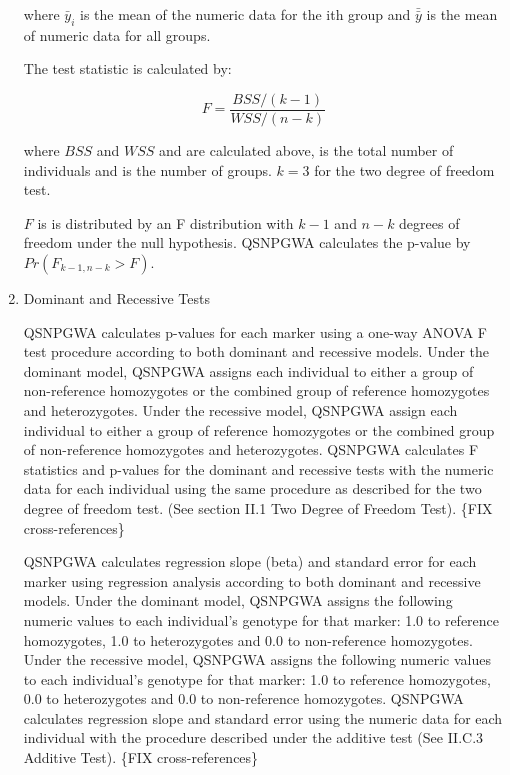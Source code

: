 \begin{enumerate}
  where $\bar{y}_i$ is the mean of the numeric data for the ith group and
  $\bar{\bar{y}}$ is the mean of numeric data for all groups.

  The test statistic is calculated by:

  \begin{equation*}
    F = \frac{BSS/\left(k-1\right)}{WSS/\left(n-k\right)}
  \end{equation*}

  where $BSS$ and $WSS$ and are calculated above, is the total number of
  individuals and is the number of groups. $k=3$ for the two degree of freedom
  test.

  $F$ is is distributed by an F distribution with $k-1$ and $n-k$ degrees of
  freedom under the null hypothesis.  QSNPGWA calculates the p-value by
  $Pr\left(F_{k-1,n-k} > F\right)$.

  \item{Dominant and Recessive Tests}

    QSNPGWA calculates p-values for each marker using a one-way ANOVA F test
    procedure according to both dominant and recessive models.  Under the
    dominant model, QSNPGWA assigns each individual to either a group of
    non-reference homozygotes or the combined group of reference homozygotes and
    heterozygotes.  Under the recessive model, QSNPGWA assign each individual to
    either a group of reference homozygotes or the combined group of
    non-reference homozygotes and heterozygotes.  QSNPGWA calculates F
    statistics and p-values for the dominant and recessive tests with the
    numeric data for each individual using the same procedure as described for
    the two degree of freedom test.  (See section II.1 Two Degree of Freedom
    Test). \{FIX cross-references\}

    QSNPGWA calculates regression slope (beta) and standard error for each
    marker using regression analysis according to both dominant and recessive
    models.  Under the dominant model, QSNPGWA assigns the following numeric
    values to each individual’s genotype for that marker: 1.0 to reference
    homozygotes, 1.0 to heterozygotes and 0.0 to non-reference homozygotes.
    Under the recessive model, QSNPGWA assigns the following numeric values to
    each individual’s genotype for that marker: 1.0 to reference homozygotes,
    0.0 to heterozygotes and 0.0 to non-reference homozygotes.  QSNPGWA
    calculates regression slope and standard error using the numeric data for
    each individual with the procedure described under the additive test (See
    II.C.3 Additive Test).  \{FIX cross-references\}


\end{enumerate}
